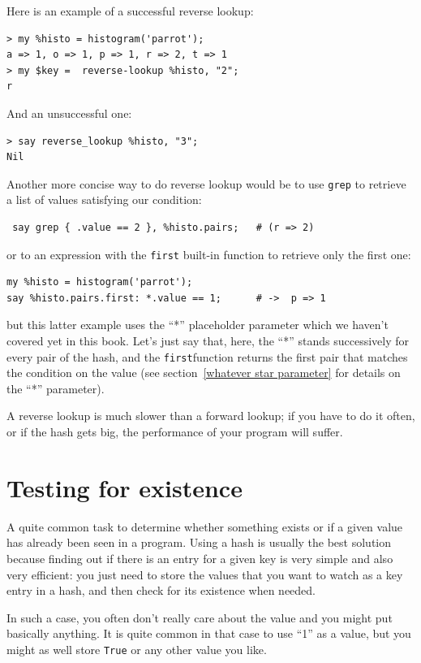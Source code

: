 Here is an example of a successful reverse lookup:

\begin{verbatim}
> my %histo = histogram('parrot');
a => 1, o => 1, p => 1, r => 2, t => 1
> my $key =  reverse-lookup %histo, "2";
r
\end{verbatim}
%
And an unsuccessful one:

\begin{verbatim}
> say reverse_lookup %histo, "3";
Nil
\end{verbatim}
%

Another more concise way to do reverse lookup would be to 
use {\tt grep} to retrieve a list of values satisfying our 
condition:
\begin{verbatim}
 say grep { .value == 2 }, %histo.pairs;   # (r => 2)
\end{verbatim}

or to an expression with the {\tt first} built-in function 
to retrieve only the first one:
\begin{verbatim}
my %histo = histogram('parrot');
say %histo.pairs.first: *.value == 1;      # ->  p => 1
\end{verbatim}

but this latter example uses the ``*'' placeholder parameter 
which we haven't covered yet in this book. Let's just say that, 
here, the ``*'' stands successively for every pair of the hash, 
and the {\tt first}function returns the first pair that matches 
the condition on the value (see 
section~\ref{whatever star parameter} for details on the 
``*'' parameter).

A reverse lookup is much slower than a forward lookup; if you
have to do it often, or if the hash gets big, the performance
of your program will suffer.

\section{Testing for existence}

A quite common task to determine whether something exists or 
if a given value has already been seen in a program. Using a 
hash is usually the best solution because finding out if 
there is an entry for a given key is very simple and also 
very efficient: you just need to store the values that you 
want to watch as a key entry in a hash, and then check for 
its existence when needed.

In such a case, you often don't really 
care about the value and you might put basically anything. 
It is quite common in that case to use ``1'' as a value, but 
you might as well store {\tt True} or any other value you 
like.

